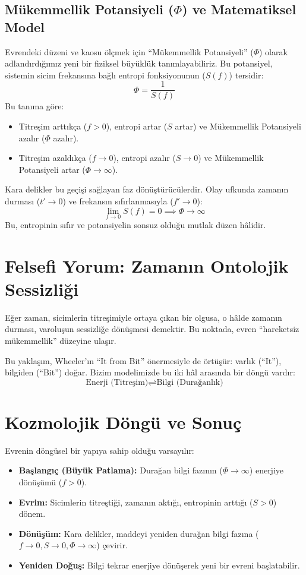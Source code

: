 \documentclass[12pt,a4paper]{article}
\begin{document}
\subsection{Mükemmellik Potansiyeli ($\Phi$) ve Matematiksel Model}
Evrendeki düzeni ve kaosu ölçmek için ``Mükemmellik Potansiyeli'' ($\Phi$) olarak adlandırdığımız yeni bir fiziksel büyüklük tanımlayabiliriz. Bu potansiyel, sistemin sicim frekansına bağlı entropi fonksiyonunun ($S(f)$) tersidir:
\begin{equation}
\Phi = \frac{1}{S(f)}
\end{equation}
Bu tanıma göre:
\begin{itemize}
    \item Titreşim arttıkça ($f > 0$), entropi artar ($S$ artar) ve Mükemmellik Potansiyeli azalır ($\Phi$ azalır).
    \item Titreşim azaldıkça ($f \to 0$), entropi azalır ($S \to 0$) ve Mükemmellik Potansiyeli artar ($\Phi \to \infty$).
\end{itemize}
Kara delikler bu geçişi sağlayan faz dönüştürücülerdir. Olay ufkunda zamanın durması ($t' \to 0$) ve frekansın sıfırlanmasıyla ($f' \to 0$):
\begin{equation}
\lim_{f \to 0} S(f) = 0 \implies \Phi \to \infty
\end{equation}
Bu, entropinin sıfır ve potansiyelin sonsuz olduğu mutlak düzen hâlidir.

\section{Felsefi Yorum: Zamanın Ontolojik Sessizliği}
Eğer zaman, sicimlerin titreşimiyle ortaya çıkan bir olgusa, 
o hâlde zamanın durması, varoluşun sessizliğe dönüşmesi demektir. 
Bu noktada, evren ``hareketsiz mükemmellik'' düzeyine ulaşır. 

Bu yaklaşım, Wheeler’ın ``It from Bit'' önermesiyle de örtüşür: 
varlık (``It''), bilgiden (``Bit'') doğar. 
Bizim modelimizde bu iki hâl arasında bir döngü vardır:
\[
\text{Enerji (Titreşim)} \rightleftharpoons \text{Bilgi (Durağanlık)}
\]

\section{Kozmolojik Döngü ve Sonuç}
Evrenin döngüsel bir yapıya sahip olduğu varsayılır:
\begin{itemize}
\item \textbf{Başlangıç (Büyük Patlama):} Durağan bilgi fazının ($\Phi \to \infty$) enerjiye dönüşümü ($f > 0$).
\item \textbf{Evrim:} Sicimlerin titreştiği, zamanın aktığı, entropinin arttığı ($S > 0$) dönem.
\item \textbf{Dönüşüm:} Kara delikler, maddeyi yeniden durağan bilgi fazına ($f \to 0, S \to 0, \Phi \to \infty$) çevirir.
\item \textbf{Yeniden Doğuş:} Bilgi tekrar enerjiye dönüşerek yeni bir evreni başlatabilir.
\end{itemize}
\end{document}
